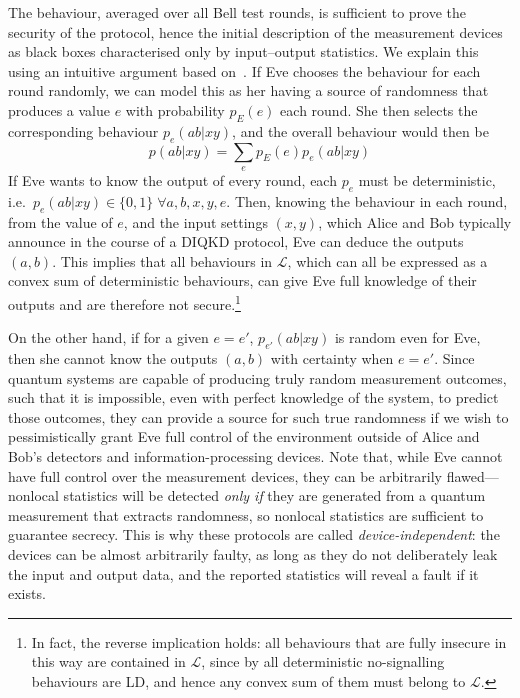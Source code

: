 \documentclass[10pt, a4paper]{article}
\numberwithin{equation}{section} %
\theoremstyle{definition}
\theoremstyle{plain}
\newcommand{\?}{\mathrel{?}} %
\newcommand{\Ls}{\mathcal{L}}
\begin{document}
    The behaviour, averaged over all Bell test rounds, is sufficient to prove the security of the protocol, hence the initial description of the measurement devices as black boxes characterised only by input--output statistics. We explain this using an intuitive argument based on~\cite[Sec. 1.3]{DIQKD_StdProto}. If Eve chooses the behaviour for each round randomly, we can model this as her having a source of randomness that produces a value \(e\) with probability \(p_E(e)\) each round. She then selects the corresponding behaviour \(p_e(ab|xy)\), and the overall behaviour would then be
    \begin{equation}\label{eqn:eveattack}
      p(ab|xy) = \sum_e p_E(e) p_e(ab|xy)
    \end{equation}
    If Eve wants to know the output of every round, each \(p_e\) must be deterministic, i.e.\ \(p_e(ab|xy) \in \{0, 1\}\;\forall a,b,x,y,e\). Then, knowing the behaviour in each round, from the value of \(e\), and the input settings \((x,y)\), which Alice and Bob typically announce in the course of a DIQKD protocol, Eve can deduce the outputs \((a,b)\). This implies that all behaviours in \(\Ls\), which can all be expressed as a convex sum of deterministic behaviours, can give Eve full knowledge of their outputs and are therefore not secure.\footnote{In fact, the reverse implication holds: all behaviours that are fully insecure in this way are contained in \(\Ls\), since by  all deterministic no-signalling behaviours are LD, and hence any convex sum of them must belong to \(\Ls\).}

    On the other hand, if for a given \(e = e'\), \(p_{e'}(ab|xy)\) is random even for Eve, then she cannot know the outputs \((a,b)\) with certainty when \(e=e'\). Since quantum systems are capable of producing truly random measurement outcomes, such that it is impossible, even with perfect knowledge of the system, to predict those outcomes, they can provide a source for such true randomness if we wish to pessimistically grant Eve full control of the environment outside of Alice and Bob's detectors and information-processing devices. Note that, while Eve cannot have full control over the measurement devices, they can be arbitrarily flawed---nonlocal statistics will be detected \emph{only if} they are generated from a quantum measurement that extracts randomness, so nonlocal statistics are sufficient to guarantee secrecy. This is why these protocols are called \emph{device-independent}: the devices can be almost arbitrarily faulty, as long as they do not deliberately leak the input and output data, and the reported statistics will reveal a fault if it exists.
\end{document}
